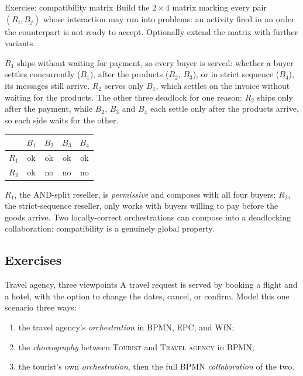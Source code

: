 \begin{examplebox}{Exercise: compatibility matrix}
Build the $2 \times 4$ matrix marking every pair $(R_i, B_j)$ whose interaction may run into problems: an activity fired in an order the counterpart is not ready to accept. Optionally extend the matrix with further variants.
\end{examplebox}

$R_1$ ships without waiting for payment, so every buyer is served: whether a buyer settles concurrently ($B_1$), after the products ($B_2$, $B_3$), or in strict sequence ($B_4$), its messages still arrive. $R_2$ serves only $B_1$, which settles on the invoice without waiting for the products. The other three deadlock for one reason: $R_2$ ships only after the payment, while $B_2$, $B_3$ and $B_4$ each settle only after the products arrive, so each side waits for the other.
\begin{center}
\begin{tabular}{lcccc}
\toprule
      & $B_1$ & $B_2$ & $B_3$ & $B_4$ \\
\midrule
$R_1$ & ok    & ok    & ok    & ok    \\
$R_2$ & ok    & no    & no    & no    \\
\bottomrule
\end{tabular}
\end{center}
$R_1$, the AND-split reseller, is \emph{permissive} and composes with all four buyers; $R_2$, the strict-sequence reseller, only works with buyers willing to pay before the goods arrive. Two locally-correct orchestrations can compose into a deadlocking collaboration: compatibility is a genuinely global property.

\subsection{Exercises}

\begin{examplebox}{Travel agency, three viewpoints}
A travel request is served by booking a flight and a hotel, with the option to change the dates, cancel, or confirm. Model this one scenario three ways:
\begin{enumerate}
  \item the travel agency's \emph{orchestration} in BPMN, EPC, and WfN;
  \item the \emph{choreography} between \textsc{Tourist} and \textsc{Travel agency} in BPMN;
  \item the tourist's own \emph{orchestration}, then the full BPMN \emph{collaboration} of the two.
\end{enumerate}
\end{examplebox}

